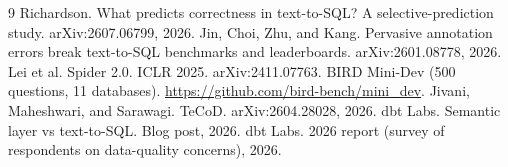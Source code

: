 \documentclass[10pt,twocolumn]{article}
\begin{document}
\begin{thebibliography}{9}\small
{} Richardson. What predicts correctness in text-to-SQL? A selective-prediction study. arXiv:2607.06799, 2026.
 Jin, Choi, Zhu, and Kang. Pervasive annotation errors break text-to-SQL benchmarks and leaderboards. arXiv:2601.08778, 2026.
 Lei et al. Spider 2.0. ICLR 2025. arXiv:2411.07763.
 BIRD Mini-Dev (500 questions, 11 databases). \url{https://github.com/bird-bench/mini_dev}.
 Jivani, Maheshwari, and Sarawagi. TeCoD. arXiv:2604.28028, 2026.
 dbt Labs. Semantic layer vs text-to-SQL. Blog post, 2026.
 dbt Labs. 2026 report (survey of respondents on data-quality concerns), 2026.
\end{thebibliography}
\end{document}
